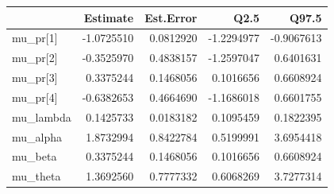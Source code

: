 
\begin{tabular}{lrrrr}
\toprule
  & Estimate & Est.Error & Q2.5 & Q97.5\\
\midrule
mu\_pr[1] & -1.0725510 & 0.0812920 & -1.2294977 & -0.9067613\\
mu\_pr[2] & -0.3525970 & 0.4838157 & -1.2597047 & 0.6401631\\
mu\_pr[3] & 0.3375244 & 0.1468056 & 0.1016656 & 0.6608924\\
mu\_pr[4] & -0.6382653 & 0.4664690 & -1.1686018 & 0.6601755\\
mu\_lambda & 0.1425733 & 0.0183182 & 0.1095459 & 0.1822395\\
\addlinespace
mu\_alpha & 1.8732994 & 0.8422784 & 0.5199991 & 3.6954418\\
mu\_beta & 0.3375244 & 0.1468056 & 0.1016656 & 0.6608924\\
mu\_theta & 1.3692560 & 0.7777332 & 0.6068269 & 3.7277314\\
\bottomrule
\end{tabular}
